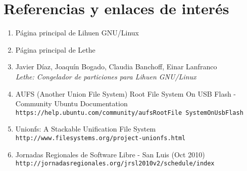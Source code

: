 \documentclass[final,narroweqnarray,inline,twoside]{ieee}
\begin{document}
\section{Referencias y enlaces de interés}

\begin{enumerate}
\item Página principal de Lihuen GNU/Linux\\
\item Página principal de Lethe\\
\item Javier Díaz, Joaquín Bogado, Claudia Banchoff, Einar Lanfranco
\\\textit{Lethe: Congelador de particiones para Lihuen GNU/Linux}\\
\item AUFS (Another Union File System) Root File System On USB Flash - Community Ubuntu Documentation\\
\texttt{https://help.ubuntu.com/community/aufsRootFile SystemOnUsbFlash}
\item Unionfs: A Stackable Unification File System\\
\texttt{http://www.filesystems.org/project-unionfs.html}
\item Jornadas Regionales de Software Libre - San Luis (Oct 2010)\\
\texttt{http://jornadasregionales.org/jrsl2010v2/schedule/index}
\end{enumerate}
\end{document}
